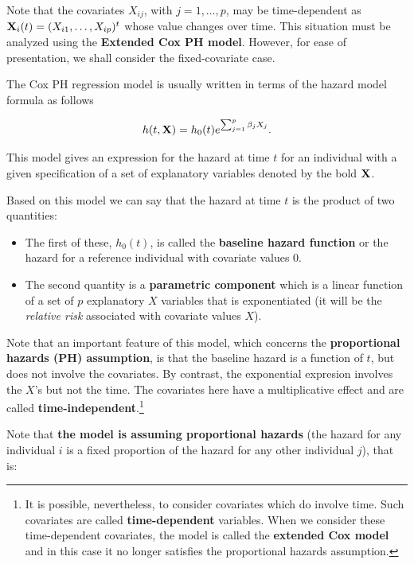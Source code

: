 \documentclass[]{book}
\let\rmarkdownfootnote\footnote%
\def\footnote{\protect\rmarkdownfootnote}
\theoremstyle{definition}
\theoremstyle{definition}
\theoremstyle{definition}
\theoremstyle{remark}
\let\BeginKnitrBlock\begin \let\EndKnitrBlock\end
\begin{document}
\BeginKnitrBlock{rmdhint_sestelo}
Note that the covariates \(X_{ij}\), with \(j = 1, \ldots, p\), may be
time-dependent as \(\textbf X_i(t)=(X_{i1},\ldots,X_{ip})^t\) whose
value changes over time. This situation must be analyzed using the
\textbf{Extended Cox PH model}. However, for ease of presentation, we
shall consider the fixed-covariate case.
\EndKnitrBlock{rmdhint_sestelo}

The Cox PH regression model \citep{CIS-11133} is usually written in
terms of the hazard model formula as follows

\[
h(t, \textbf X) = h_0(t)  e^{\sum_{j=1}^p \beta_j X_j}.
\]

This model gives an expression for the hazard at time \(t\) for an
individual with a given specification of a set of explanatory variables
denoted by the bold \(\textbf X\).

Based on this model we can say that the hazard at time \(t\) is the
product of two quantities:

\begin{itemize}
\item
  The first of these, \(h_0(t)\), is called the \textbf{baseline hazard
  function} or the hazard for a reference individual with covariate
  values 0.
\item
  The second quantity is a \textbf{parametric component} which is a
  linear function of a set of \(p\) explanatory \(X\) variables that is
  exponentiated (it will be the \emph{relative risk} associated with
  covariate values \(X\)).
\end{itemize}

Note that an important feature of this model, which concerns the
\textbf{proportional hazards (PH) assumption}, is that the baseline
hazard is a function of \(t\), but does not involve the covariates. By
contrast, the exponential expresion involves the \(X\)'s but not the
time. The covariates here have a multiplicative effect and are called
\textbf{time-independent}.\footnote{It is possible, nevertheless, to
  consider covariates which do involve time. Such covariates are called
  \textbf{time-dependent} variables. When we consider these
  time-dependent covariates, the model is called the \textbf{extended
  Cox model} and in this case it no longer satisfies the proportional
  hazards assumption.}

Note that \textbf{the model is assuming proportional hazards} (the
hazard for any individual \(i\) is a fixed proportion of the hazard for
any other individual \(j\)), that is:
\end{document}
